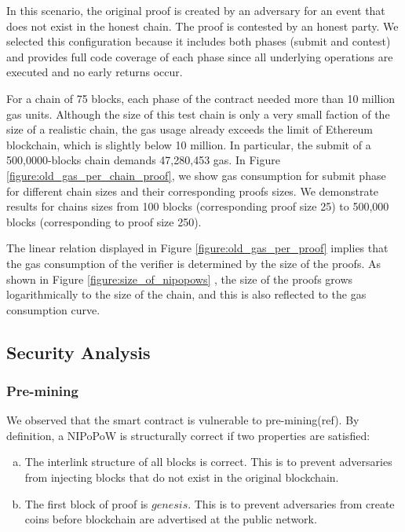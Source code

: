 


In this scenario, the original proof is created by an adversary for an event
that does not exist in the honest chain. The proof is contested by an honest
party. We selected this configuration because it includes both phases
(submit and contest) and provides full code coverage of each phase since all
underlying operations are executed and no early returns occur.

For a chain of 75 blocks, each phase of the contract needed more than 10
million gas units. Although the size of this test chain is only a very small
faction of the size of a realistic chain, the gas usage already exceeds the
limit of Ethereum blockchain, which is slightly below 10 million. In
particular, the submit of a 500,0000-blocks chain demands 47,280,453 gas. In
Figure \ref{figure:old_gas_per_chain_proof}, we show gas consumption for submit
phase for different chain sizes and their corresponding proofs sizes. We
demonstrate results for chains sizes from 100 blocks (corresponding proof size
25) to 500,000 blocks (corresponding to proof size 250).

The linear relation displayed in Figure \ref{figure:old_gas_per_proof} implies
that the gas consumption of the verifier is determined by the size of the
proofs. As shown in Figure \ref{figure:size_of_nipopows} , the size of the
proofs grows logarithmically to the size of the chain, and this is also
reflected to the gas consumption curve.






\subsection{Security Analysis}

\subsubsection{Pre-mining} We observed that the smart contract is vulnerable to
pre-mining(ref). By definition, a NIPoPoW is structurally correct if two
properties are satisfied:

\begin{enumerate}[(a)]

\item The interlink structure of all blocks is correct. This is to prevent
    adversaries from injecting blocks that do not exist in the original
    blockchain.

\item The first block of proof is $genesis$. This is to prevent adversaries
    from create coins before blockchain are advertised at the public network.

\end{enumerate}

